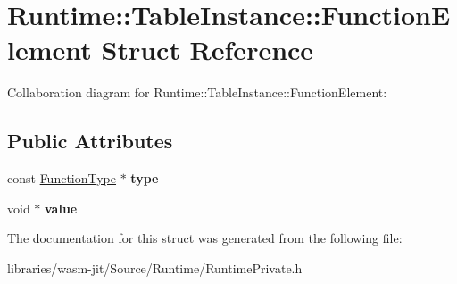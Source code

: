 \hypertarget{struct_runtime_1_1_table_instance_1_1_function_element}{}\section{Runtime\+:\+:Table\+Instance\+:\+:Function\+Element Struct Reference}
\label{struct_runtime_1_1_table_instance_1_1_function_element}


Collaboration diagram for Runtime\+:\+:Table\+Instance\+:\+:Function\+Element\+:
\subsection*{Public Attributes}
\begin{DoxyCompactItemize}
\item 
\mbox{\label{struct_runtime_1_1_table_instance_1_1_function_element_a1c984c72ee2ead66db5b2a80705e64e4}} 
const \mbox{\hyperlink{struct_i_r_1_1_function_type}{Function\+Type}} $\ast$ {\bfseries type}
\item 
\mbox{\label{struct_runtime_1_1_table_instance_1_1_function_element_a69af2df24b2e03946a8e72f61254a66a}} 
void $\ast$ {\bfseries value}
\end{DoxyCompactItemize}


The documentation for this struct was generated from the following file\+:\begin{DoxyCompactItemize}
\item 
libraries/wasm-\/jit/\+Source/\+Runtime/Runtime\+Private.\+h\end{DoxyCompactItemize}
